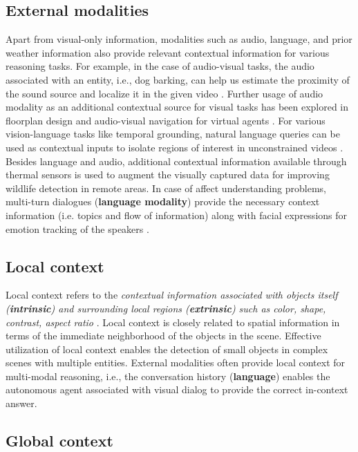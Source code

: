 \subsection{External modalities}
Apart from visual-only information, modalities such as audio, language, and prior weather information also provide relevant contextual information for various reasoning tasks. For example, in the case of audio-visual tasks, the audio associated with an entity, i.e., dog barking, can help us estimate the proximity of the sound source and localize it in the given video \cite{Tian2018AudioVisualEL}. Further usage of audio modality as an additional contextual source for visual tasks has been explored in floorplan design \cite{purushwalkam2020audio} and audio-visual navigation for virtual agents \cite{chen2020soundspaces}. For various vision-language tasks like temporal grounding, natural language queries can be used as contextual inputs to isolate regions of interest in unconstrained videos \cite{Zhang2022TemporalSG}. Besides language and audio, additional contextual information available through thermal sensors \cite{Seymour2017AutomatedDA} is used to augment the visually captured data for improving wildlife detection in remote areas. In case of affect understanding problems, multi-turn dialogues (\textbf{language modality}) provide the necessary context information (i.e. topics and flow of information) along with facial expressions for emotion tracking of the speakers \cite{Zhao2022M3EDMM}.

\subsection{Local context}
Local context refers to the \textit{contextual information associated with objects itself (\textbf{intrinsic}) and surrounding local regions (\textbf{extrinsic}) such as color, shape, contrast, aspect ratio} \cite{contextvision}. Local context is closely related to spatial information in terms of the immediate neighborhood of the objects in the scene. Effective utilization of local context enables the detection of small objects in complex scenes with multiple entities. External modalities often provide local context for multi-modal reasoning, i.e., the conversation history (\textbf{language}) enables the autonomous agent associated with visual dialog \cite{Das2016VisualD} to provide the correct in-context answer.

\subsection{Global context}

